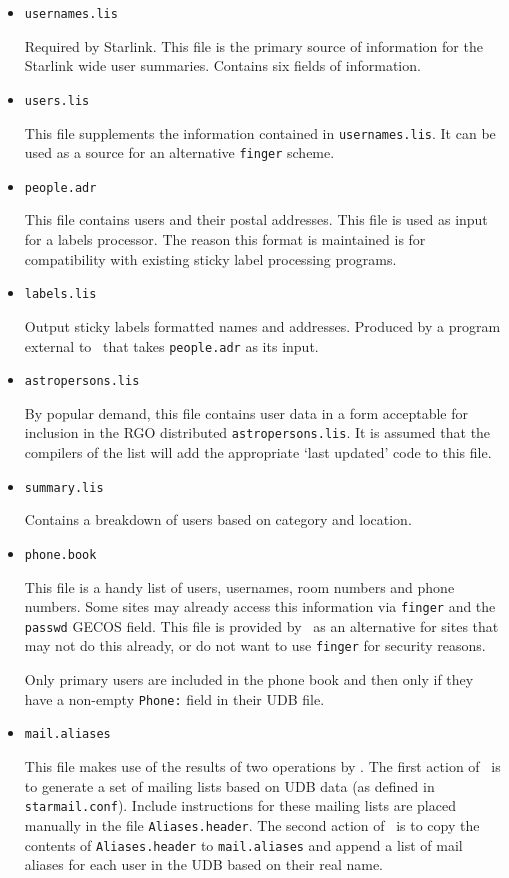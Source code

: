 \begin{itemize}
\item {\Large\tt usernames.lis}

Required by Starlink. This file is the primary source of information for the
Starlink wide user summaries. Contains six fields of information.

\item {\Large\tt users.lis}

This file supplements the information contained in {\tt usernames.lis}. It can
be used as a source for an alternative {\tt finger} scheme.

\item {\Large\tt people.adr}

This file contains users and their postal addresses. This file is used as
input for a labels processor. The reason this format is maintained is for
compatibility with existing sticky label processing programs.

\item {\Large\tt labels.lis}

Output sticky labels formatted names and addresses. Produced by a program
external to \staradmin\ that takes {\tt people.adr} as its input.

\item {\Large\tt astropersons.lis}

By popular demand, this file contains user data in a form acceptable for
inclusion in the RGO distributed {\tt astropersons.lis}. It is assumed that the
compilers of the list will add the appropriate `last updated' code to this
file.

\item {\Large\tt summary.lis}

Contains a breakdown of users based on category and location.

\item {\Large\tt phone.book}

This file is a handy list of users, usernames, room numbers and phone numbers.
Some sites may already access this information via {\tt finger} and the {\tt
passwd} GECOS field. This file is provided by \staradmin\ as an alternative
for sites that may not do this already, or do not want to use {\tt finger} for
security reasons.

Only primary users are included in the phone book and then only if they have a
non-empty {\tt Phone:} field in their UDB file.

\item {\Large\tt mail.aliases}

This file makes use of the results of two operations by \staradmin. The first
action of \staradmin\ is to generate a set of mailing lists based on UDB data
(as defined in {\tt starmail.conf}). Include instructions for these mailing
lists are placed manually in
the file {\tt Aliases.header}. The second action of \staradmin\ is to copy the
contents of {\tt Aliases.header} to {\tt mail.aliases} and append a list of
mail aliases for each user in the UDB based on their real name.

\end{itemize}

